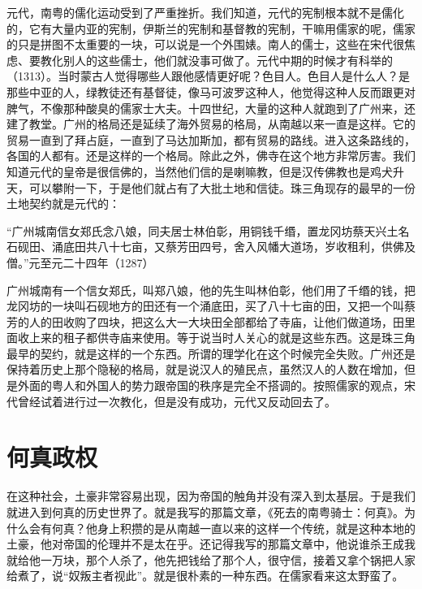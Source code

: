 元代，南粤的儒化运动受到了严重挫折。我们知道，元代的宪制根本就不是儒化的，它有大量内亚的宪制，伊斯兰的宪制和基督教的宪制，干嘛用儒家的呢，儒家的只是拼图不太重要的一块，可以说是一个外围婊。南人的儒士，这些在宋代很焦虑、要教化别人的这些儒士，他们就没事可做了。元代中期的时候才有科举的（1313）。当时蒙古人觉得哪些人跟他感情更好呢？色目人。色目人是什么人？是那些中亚的人，绿教徒还有基督徒，像马可波罗这种人，他觉得这种人反而跟更对脾气，不像那种酸臭的儒家士大夫。十四世纪，大量的这种人就跑到了广州来，还建了教堂。广州的格局还是延续了海外贸易的格局，从南越以来一直是这样。它的贸易一直到了拜占庭，一直到了马达加斯加，都有贸易的路线。进入这条路线的，各国的人都有。还是这样的一个格局。除此之外，佛寺在这个地方非常厉害。我们知道元代的皇帝是很信佛的，当然他们信的是喇嘛教，但是汉传佛教也是鸡犬升天，可以攀附一下，于是他们就占有了大批土地和信徒。珠三角现存的最早的一份土地契约就是元代的：

“广州城南信女郑氏念八娘，同夫居士林伯彰，用铜钱千缗，置龙冈坊蔡天兴土名石砚田、涌底田共八十七亩，又蔡芳田四号，舍入风幡大道场，岁收租利，供佛及僧。”元至元二十四年（1287）

广州城南有一个信女郑氏，叫郑八娘，他的先生叫林伯彰，他们用了千缗的钱，把龙冈坊的一块叫石砚地方的田还有一个涌底田，买了八十七亩的田，又把一个叫蔡芳的人的田收购了四块，把这么大一大块田全部都给了寺庙，让他们做道场，田里面收上来的租子都供寺庙来使用。等于说当时人关心的就是这些东西。这是珠三角最早的契约，就是这样的一个东西。所谓的理学化在这个时候完全失败。广州还是保持着历史上那个隐秘的格局，就是说汉人的殖民点，虽然汉人的人数在增加，但是外面的粤人和外国人的势力跟帝国的秩序是完全不搭调的。按照儒家的观点，宋代曾经试着进行过一次教化，但是没有成功，元代又反动回去了。

\section{何真政权}

在这种社会，土豪非常容易出现，因为帝国的触角并没有深入到太基层。于是我们就进入到何真的历史世界了。就是我写的那篇文章，《死去的南粤骑士：何真》。为什么会有何真？他身上积攒的是从南越一直以来的这样一个传统，就是这种本地的土豪，他对帝国的伦理并不是太在乎。还记得我写的那篇文章中，他说谁杀王成我就给他一万块，那个人杀了，他先把钱给了那个人，很守信，接着又拿个锅把人家给煮了，说“奴叛主者视此”。就是很朴素的一种东西。在儒家看来这太野蛮了。

